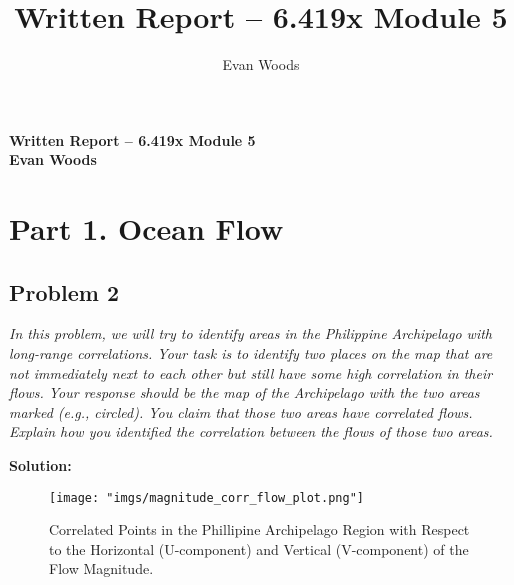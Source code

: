\documentclass[11pt]{article}
\title{Written Report – 6.419x Module 5}
\author{Evan Woods}
\date{}
\newcommand{\question}[1]{\textit{#1}}
\begin{document}
\begin{center}
    \Large \textbf{Written Report – 6.419x Module 5} \\[5ex]
    \large \textbf{Evan Woods}\\[1ex]
\end{center}

\tableofcontents
\newpage

\vspace{1em}

\section{Part 1. Ocean Flow}

\subsection{Problem 2}
\question{In this problem, we will try to identify areas in the Philippine Archipelago with long-range correlations. Your task is to identify two places on the map that are not immediately next to each other but still have some high correlation in their flows. Your response should be the map of the Archipelago with the two areas marked (e.g., circled). You claim that those two areas have correlated flows. Explain how you identified the correlation between the flows of those two areas.
}

\textbf{Solution:} \\

\begin{figure}[htbp]
    \centering
    \texttt{[image: "imgs/magnitude\_corr\_flow\_plot.png"]} %
    \caption{Correlated Points in the Phillipine Archipelago Region with Respect to the Horizontal (U-component) and Vertical (V-component) of the Flow Magnitude.}
    \label{fig:magnitude-flow-corr}
\end{figure}
\FloatBarrier
\end{document}
